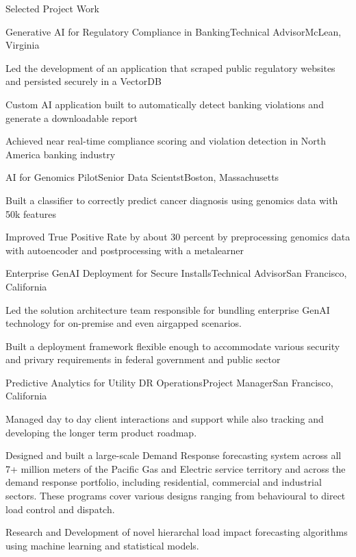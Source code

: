 \documentclass{resume} %
\begin{document}
\begin{rSection}{Selected Project Work}

\begin{rSubsection}{Generative AI for Regulatory Compliance in Banking}{}{Technical Advisor}{McLean, Virginia}
\item[] Led the development of an application that scraped public regulatory websites and persisted securely in a VectorDB 
\item[] Custom AI application built to automatically detect banking violations and generate a downloadable report
\item[] Achieved near real-time compliance scoring and violation detection in North America banking industry 
\end{rSubsection}

\begin{rSubsection}{AI for Genomics Pilot}{}{Senior Data Scientst}{Boston, Massachusetts}
\item[] Built a classifier to correctly predict cancer diagnosis using genomics data with 50k features
\item[] Improved True Positive Rate by about 30 percent by preprocessing genomics data with autoencoder and postprocessing with a metalearner
\end{rSubsection}

\begin{rSubsection}{Enterprise GenAI Deployment for Secure Installs}{}{Technical Advisor}{San Francisco, California}
\item[] Led the solution architecture team responsible for bundling enterprise GenAI technology for on-premise and even airgapped scenarios.
\item[] Built a deployment framework flexible enough to accommodate various security and privary requirements in federal government and public sector
\end{rSubsection}

\begin{rSubsection}{Predictive Analytics for Utility DR Operations}{}{Project Manager}{San Francisco, California}
\item[] Managed day to day client interactions and support while also tracking and developing the longer term product roadmap.
\item[] Designed and built a large-scale Demand Response forecasting system across all 7+ million meters of the Pacific Gas and Electric service territory and across the demand response portfolio, including residential, commercial and industrial sectors. These programs cover various designs ranging from behavioural to direct load control and dispatch.
\item[] Research and Development of novel hierarchal load impact forecasting algorithms using machine learning and statistical models.
\end{rSubsection}


\end{rSection}
\end{document}
